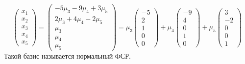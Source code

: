 \documentclass[a4paper, 12pt]{article}
\theoremstyle{definition}
\begin{document}
  $$\begin{pmatrix}
    x_1 \\ x_2 \\ \hline x_3 \\ x_4 \\ x_5
  \end{pmatrix} = \begin{pmatrix}
    -5\mu_3-9\mu_4+3\mu_5 \\ 2\mu_3 + 4\mu_4-2\mu_5 \\ \hline \mu_3 \\ \mu_4 \\ \mu_5
  \end{pmatrix} = \mu_3 \begin{pmatrix}
    -5 \\ 2 \\ \hline 1 \\ 0 \\ 0
  \end{pmatrix} + \mu_4 \begin{pmatrix}
    -9 \\ 4 \\ \hline 0 \\ 1 \\ 0
  \end{pmatrix} + \mu_5 \begin{pmatrix}
    3 \\ -2 \\ \hline 0 \\ 0 \\ 1 
  \end{pmatrix}$$ 
  Такой базис называется нормальный ФСР. 
\end{document}
